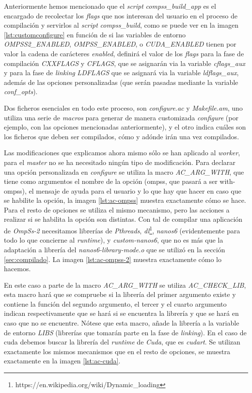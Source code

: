 Anteriormente hemos mencionado que el \textit{script} \textit{compss\_build\_app} es el encargado de recolectar los \textit{flags} que nos interesan del usuario en el proceso de compilación y servirlos al \textit{script} \textit{compss\_build}, como se puede ver en la imagen \ref{lst:customconfigure} en función de si las variables de entorno \textit{OMPSS2\_ENABLED}, \textit{OMPSS\_ENABLED}, o \textit{CUDA\_ENABLED} tienen por valor la cadena de carácteres \textit{enabled}, definirá el valor de los \textit{flags} para la fase de compilación \textit{CXXFLAGS} y \textit{CFLAGS}, que se asignarán via la variable \textit{cflags\_aux} y para la fase de \textit{linking} \textit{LDFLAGS} que se asignará via la variable \textit{ldflags\_aux}, además de las opciones personalizadas (que serán pasadas mediante la variable \textit{conf\_opts}).
\par\smallskip
Dos ficheros esenciales en todo este proceso, son \textit{configure.ac} y \textit{Makefile.am}, uno utiliza una serie de \textit{macros} para generar de manera customizada \textit{configure} (por ejemplo, con las opciones mencionadas anteriormente), y el otro indica cuáles son los ficheros que deben ser compilados, cómo y adónde irán una vez compilados.
\par\bigskip
Las modificaciones que explicamos ahora mismo sólo se han aplicado al \textit{worker}, para el \textit{master} no se ha necesitado ningún tipo de modificación. Para declarar una opción personalizada en \textit{configure} se utiliza la macro \textit{AC\_ARG\_WITH}, que tiene como argumentos el nombre de la opción (ompss, que pasará a ser with-ompss), el mensaje de ayuda para el usuario y lo que hay que hacer en caso que se habilite la opción, la imagen \ref{lst:ac-ompss} muestra exactamente cómo se hace.
\bigskip
Para el resto de opciones se utiliza el mismo mecanismo, pero las acciones a realizar si se habilita la opción son distintas. Con tal de compilar una aplicación de \textit{OmpSs-2} necesitamos librerías de \textit{Pthreads}, \textit{dl}\footnote{https://en.wikipedia.org/wiki/Dynamic\_loading}, \textit{nanos6} (evidentemente para todo lo que concierne al \textit{runtime}), y \textit{custom-nanos6}, que no es más que la adaptación a librería del \textit{nanos6-library-mode.o} que se utilizó en la sección \ref{sec:compilado}. La imagen \ref{lst:ac-ompss-2} muestra exactamente cómo lo hacemos.
\bigskip

En este caso a parte de la macro \textit{AC\_ARG\_WITH} se utiliza \textit{AC\_CHECK\_LIB}, esta macro hará que se compruebe si la librería del primer argumento existe y contiene la función del segundo argumento, el tercer y el cuarto argumento indican respectivamente que se hará si se encuentra la librería y que se hará en caso que no se encuentre. Nótese que esta macro, añade la librería a la variable de entorno \textit{LIBS} (librerías que tomarán parte en la fase de \textit{linking}). En el caso de cuda debemos buscar la librería del \textit{runtime} de \textit{Cuda}, que es \textit{cudart}. Se utilizan exactamente los mismos mecanismos que en el resto de opciones, se muestra exactamente en la imagen \ref{lst:ac-cuda}.

